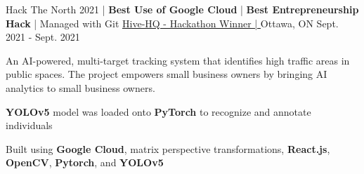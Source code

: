 \begin{cventries}



	\cventry
	{Hack The North 2021 | \textbf{Best Use of Google Cloud} | \textbf{Best Entrepreneurship Hack} | Managed with Git} %
	{\underline{\href{https://devpost.com/software/hive-hq}{Hive-HQ - Hackathon Winner | \ExternalLink}}} %
	{Ottawa, ON} %
	{Sept. 2021 - Sept. 2021} %
	{
		\begin{cvitems} %
			\item {An AI-powered, multi-target tracking system that identifies high traffic areas in public spaces. The project empowers small business owners by bringing AI analytics to small business owners.}
			\item {\textbf{YOLOv5} model was loaded onto \textbf{PyTorch} to recognize and annotate individuals}
			\item {Built using \textbf{Google Cloud}, matrix perspective transformations, \textbf{React.js}, \textbf{OpenCV}, \textbf{Pytorch}, and \textbf{YOLOv5}}
		\end{cvitems}
	}


\end{cventries}
